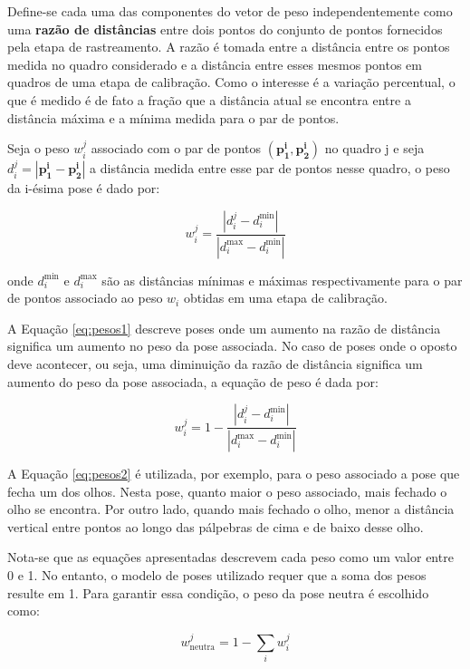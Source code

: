 Define-se cada uma das componentes do vetor de peso independentemente como uma
\textbf{razão de distâncias} entre dois pontos do conjunto de pontos fornecidos
pela etapa de rastreamento. A razão é tomada entre a distância entre os pontos
medida no quadro considerado e a distância entre esses mesmos pontos em quadros
de uma etapa de calibração. Como o interesse é a variação percentual, o que é
medido é de fato a fração que a distância atual se encontra entre a distância
máxima e a mínima medida para o par de pontos.

Seja o peso $w_i^j$ associado com o par de pontos $(\bm{p_1^i}, \bm{p_2^i})$ no
quadro j e seja $d_i^j = |\bm{p_1^i} - \bm{p_2^i}|$ a distância medida entre
esse par de pontos nesse quadro, o peso da i-ésima pose é dado por:

\begin{equation}
	w_i^j = \frac{|d_i^j - d_i^{\text{min}}|}{|d_i^{\text{max}} - d_i^{\text{min}}|}
   \label{eq:pesos1}
\end{equation}

onde $d_i^{\text{min}}$ e $d_i^{\text{max}}$ são as distâncias mínimas e máximas
respectivamente para o par de pontos associado ao peso $w_i$ obtidas em uma
etapa de calibração. 

A Equação \ref{eq:pesos1} descreve poses onde um aumento na razão de distância
significa um aumento no peso da pose associada. No caso de poses onde o oposto
deve acontecer, ou seja, uma diminuição da razão de distância significa um
aumento do peso da pose associada, a equação de peso é dada por: 

\begin{equation}
	w_i^j = 1 - \frac{|d_i^j - d_i^{\text{min}}|}{|d_i^{\text{max}} - d_i^{\text{min}}|}
    \label{eq:pesos2}
\end{equation}

A Equação \ref{eq:pesos2} é utilizada, por exemplo, para o peso associado a pose
que fecha um dos olhos. Nesta pose, quanto maior o peso associado, mais fechado
o olho se encontra. Por outro lado, quando mais fechado o olho, menor a
distância vertical entre pontos ao longo das pálpebras de cima e de baixo desse
olho.

Nota-se que as equações apresentadas descrevem cada peso como um valor entre 0 e
1. No entanto, o modelo de poses utilizado requer que a soma dos pesos resulte
em 1. Para garantir essa condição, o peso da pose neutra é escolhido como:

\begin{equation}
	w_{\text{neutra}}^j = 1 - \sum_{i} w_i^j
    \label{eq:pesos3}
\end{equation}


